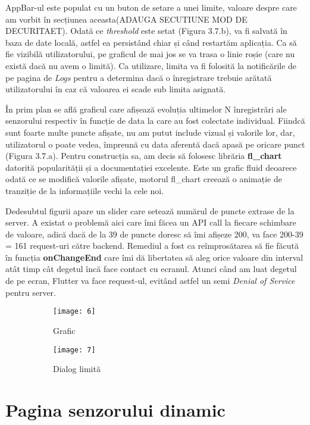 AppBar-ul este populat cu un buton de setare a unei limite, valoare despre care am vorbit în secțiunea aceasta(ADAUGA SECUTIUNE MOD DE DECURITAET). Odată ce \emph{threshold} este setat (Figura 3.7.b), va fi salvată în baza de date locală, astfel ea persistând chiar și când restartăm aplicația. Ca să fie vizibilă utilizatorului, pe graficul de mai jos se va trasa o linie roșie (care nu există dacă nu avem o limită). Ca utilizare, limita va fi folosită la notificările de pe pagina de \emph{Logs} pentru a determina dacă o înregistrare trebuie arătată utilizatorului în caz că valoarea ei scade sub limita asignată.

În prim plan se află graficul care afișează evoluția ultimelor N înregistrări ale senzorului respectiv în funcție de data la care au fost colectate individual. Fiindcă sunt foarte multe puncte afișate, nu am putut include vizual și valorile lor, dar, utilizatorul o poate vedea, împreună cu data aferentă dacă apasă pe oricare punct (Figura 3.7.a). Pentru construcția sa, am decis să folosesc librăria \textbf{fl\_chart} datorită popularității și a documentației excelente. Este un grafic fluid deoarece odată ce se modifică valorile afișate, motorul fl\_chart creează o animație de tranziție de la informațiile vechi la cele noi.

Dedesubtul figurii apare un slider care setează numărul de puncte extrase de la server. A existat o problemă aici care îmi făcea un API call la fiecare schimbare de valoare, adică dacă de la 39 de puncte doresc să îmi afișeze 200, va face 200-39 = 161 request-uri către backend. Remediul a fost ca reîmprosătarea să fie făcută în funcția \textbf{onChangeEnd} care îmi dă libertatea să aleg orice valoare din interval atât timp cât degetul încă face contact cu ecranul. Atunci când am luat degetul de pe ecran, Flutter va face request-ul, evitând astfel un semi \emph{Denial of Service} pentru server.

\begin{figure}[h]
	\centering
	\begin{subfigure}{0.45\textwidth}
		\texttt{[image: 6]}
		\caption{Grafic}
		\label{fig:6}
	\end{subfigure}
	\hfill
	\begin{subfigure}{0.45\textwidth}
		\texttt{[image: 7]}
		\caption{Dialog limită}
		\label{fig:7}
	\end{subfigure}
	\caption{}
	\label{fig:all3}
\end{figure}

\section{Pagina senzorului dinamic}

